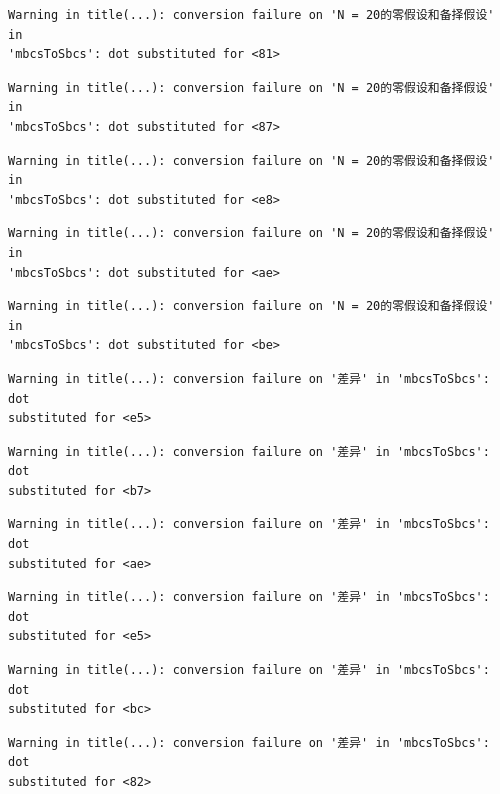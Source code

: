 \documentclass[
  letterpaper,
  DIV=11,
  numbers=noendperiod]{scrreprt}
\begin{document}
\begin{verbatim}
Warning in title(...): conversion failure on 'N = 20的零假设和备择假设' in
'mbcsToSbcs': dot substituted for <81>
\end{verbatim}

\begin{verbatim}
Warning in title(...): conversion failure on 'N = 20的零假设和备择假设' in
'mbcsToSbcs': dot substituted for <87>
\end{verbatim}

\begin{verbatim}
Warning in title(...): conversion failure on 'N = 20的零假设和备择假设' in
'mbcsToSbcs': dot substituted for <e8>
\end{verbatim}

\begin{verbatim}
Warning in title(...): conversion failure on 'N = 20的零假设和备择假设' in
'mbcsToSbcs': dot substituted for <ae>
\end{verbatim}

\begin{verbatim}
Warning in title(...): conversion failure on 'N = 20的零假设和备择假设' in
'mbcsToSbcs': dot substituted for <be>
\end{verbatim}

\begin{verbatim}
Warning in title(...): conversion failure on '差异' in 'mbcsToSbcs': dot
substituted for <e5>
\end{verbatim}

\begin{verbatim}
Warning in title(...): conversion failure on '差异' in 'mbcsToSbcs': dot
substituted for <b7>
\end{verbatim}

\begin{verbatim}
Warning in title(...): conversion failure on '差异' in 'mbcsToSbcs': dot
substituted for <ae>
\end{verbatim}

\begin{verbatim}
Warning in title(...): conversion failure on '差异' in 'mbcsToSbcs': dot
substituted for <e5>
\end{verbatim}

\begin{verbatim}
Warning in title(...): conversion failure on '差异' in 'mbcsToSbcs': dot
substituted for <bc>
\end{verbatim}

\begin{verbatim}
Warning in title(...): conversion failure on '差异' in 'mbcsToSbcs': dot
substituted for <82>
\end{verbatim}
\end{document}
